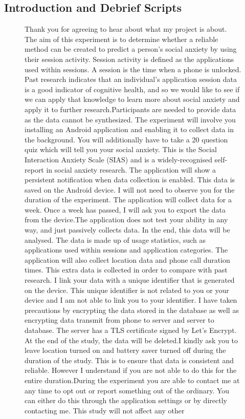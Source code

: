 \documentclass{l4proj}
\begin{document}
\begin{appendices}
\chapter{Introduction and Debrief Scripts}
\begin{figure}[htb]
Thank you for agreeing to hear about what my project is about. The aim of this experiment is to determine whether a reliable method can be created to predict a person’s social anxiety by using their session activity. Session activity is defined as the applications used within sessions. A session is the time when a phone is unlocked. Past research indicates that an individual's application session data is a good indicator of cognitive health, and so we would like to see if we can apply that knowledge to learn more about social anxiety and apply it to further research.\newline\newline Participants are needed to provide data as the data cannot be synthesized. The experiment will involve you installing an Android application and enabling it to collect data in the background. You will additionally have to take a 20 question quiz which will tell you your social anxiety. This is the Social Interaction Anxiety Scale (SIAS) and is a widely-recognised self-report in social anxiety research. The application will show a persistent notification when data collection is enabled. This data is saved on the Android device. I will not need to observe you for the duration of the experiment. The application will collect data for a week. Once a week has passed, I will ask you to export the data from the device.\newline\newline The application does not test your ability in any way, and just passively collects data. In the end, this data will be analysed. The data is made up of usage statistics, such as applications used within sessions and application categories. The application will also collect location data and phone call duration times. This extra data is collected in order to compare with past research. I link your data with a unique identifier that is generated on the device. This unique identifier is not related to you or your device and I am not able to link you to your identifier. I have taken precautions by encrypting the data stored in the database as well as encrypting data transmit from phone to server and server to database. The server has a TLS certificate signed by Let's Encrypt. At the end of the study, the data will be deleted.\newline\newline I kindly ask you to leave location turned on and battery saver turned off during the duration of the study. This is to ensure that data is consistent and reliable. However I understand if you are not able to do this for the entire duration.\newline\newline During the experiment you are able to contact me at any time to opt out or report something out of the ordinary. You can either do this through the application settings or by directly contacting me. This study will not affect any other 
\end{figure}
\end{appendices}
\end{document}
